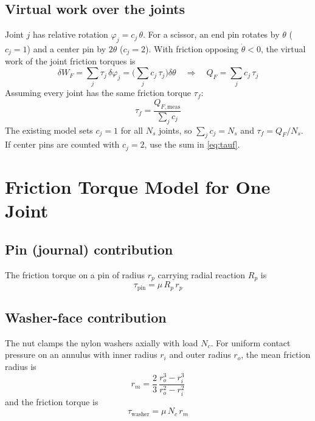 \documentclass[11pt]{article}
\newcommand{\dth}{\dot{\theta}}
\newcommand{\tauf}{\tau_f}
\newcommand{\Nc}{N_c}      %
\newcommand{\Rp}{R_p}      %
\begin{document}
\subsection*{Virtual work over the joints}

Joint $j$ has relative rotation $\varphi_j = c_j\,\theta$. For a scissor, an end pin rotates by
$\theta$ ($c_j = 1$) and a center pin by $2\theta$ ($c_j = 2$). With friction opposing $\dth<0$,
the virtual work of the joint friction torques is
\begin{equation}
\delta W_F = \sum_j \tau_j\, \delta\varphi_j
= \Big(\sum_j c_j\,\tau_j\Big)\delta\theta
\quad\Longrightarrow\quad
Q_F = \sum_j c_j\,\tau_j
\label{eq:QFsum}
\end{equation}
Assuming every joint has the same friction torque $\tauf$:
\begin{equation}
\boxed{\tauf = \frac{Q_{F,\text{meas}}}{\sum_j c_j}}
\label{eq:tauf}
\end{equation}
The existing model sets $c_j=1$ for all $N_s$ joints, so $\sum_j c_j = N_s$ and
$\tauf = Q_F/N_s$. If center pins are counted with $c_j=2$, use the sum in \eqref{eq:tauf}.

\section{Friction Torque Model for One Joint}

\subsection*{Pin (journal) contribution}

The friction torque on a pin of radius $r_p$ carrying radial reaction $\Rp$ is
\begin{equation}
\tau_{\text{pin}} = \mu\,\Rp\,r_p
\label{eq:pin}
\end{equation}

\subsection*{Washer-face contribution}

The nut clamps the nylon washers axially with load $\Nc$. For uniform contact pressure on an
annulus with inner radius $r_i$ and outer radius $r_o$, the mean friction radius is
\begin{equation}
r_m = \frac{2}{3}\,\frac{r_o^{3}-r_i^{3}}{r_o^{2}-r_i^{2}}
\label{eq:rm}
\end{equation}
and the friction torque is
\begin{equation}
\tau_{\text{washer}} = \mu\,\Nc\,r_m
\label{eq:washer}
\end{equation}
\end{document}
